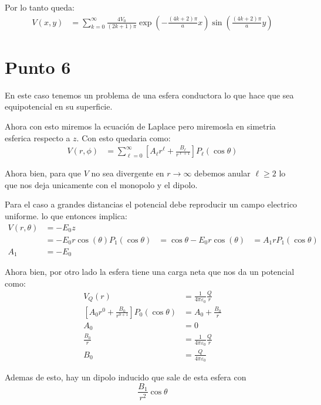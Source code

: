 \documentclass{report}
\begin{document}
Por lo tanto queda:
\begin{align*}
	V \left( x, y \right) &= \sum_{k = 0}^{\infty} \frac{4V_0}{\left( 2k + 1 \right)\pi} \exp \left( - \frac{\left( 4k + 2 \right)\pi}{a}x \right)\sin \left( \frac{(4k + 2)\pi}{a}y \right)
\end{align*}


\chapter{Punto 6}

En este caso tenemos un problema de una esfera conductora lo que hace que sea equipotencial en su superficie. 

Ahora con esto miremos la ecuación de Laplace pero miremosla en simetria esferica respecto a $z$. Con esto quedaria como:
\begin{align*}
	V \left( r, \phi \right) &= \sum_{\ell = 0}^{\infty}\left[ A_\ell r^\ell + \frac{B_\ell}{r^{\ell + 1}} \right] P_\ell \left( \cos\theta \right)
\end{align*}

Ahora bien, para que $V$ no sea divergente en $r \to \infty$ debemos anular $\ell \ge 2$ lo que nos deja unicamente con el monopolo y el dipolo.

Para el caso a grandes distancias el potencial debe reproducir un campo electrico uniforme. lo que entonces implica:
\begin{align*}
	V \left( r, \theta \right) &= - E_0 z\\
	&= -E_0 r \cos(\theta)
	P_1 \left( \cos\theta \right) &= \cos\theta
	-E_0 r \cos(\theta) &=  A_1 r P_1 \left( \cos \theta \right)\\
	A_1 &= -E_0
\end{align*}

Ahora bien, por otro lado la esfera tiene una carga neta que nos da un potencial como:
\begin{align*}
	V_Q \left( r \right) &= \frac{1}{4\pi \varepsilon_0 } \frac{Q}{r}\\
	\left[ A_0 r^0 + \frac{B_0}{r^{0 + 1}} \right]P_0 \left( \cos\theta \right) &= A_0 + \frac{B_0}{r}\\
	A_0 &= 0\\
	\frac{B_0}{r} &= \frac{1}{4\pi \varepsilon_0 } \frac{Q}{r}\\
	B_0 &= \frac{Q}{4\pi \varepsilon_0 }
\end{align*}

Ademas de esto, hay un dipolo inducido que sale de esta esfera con \[
	\frac{B_1}{r^2} \cos\theta
\]
\end{document}
